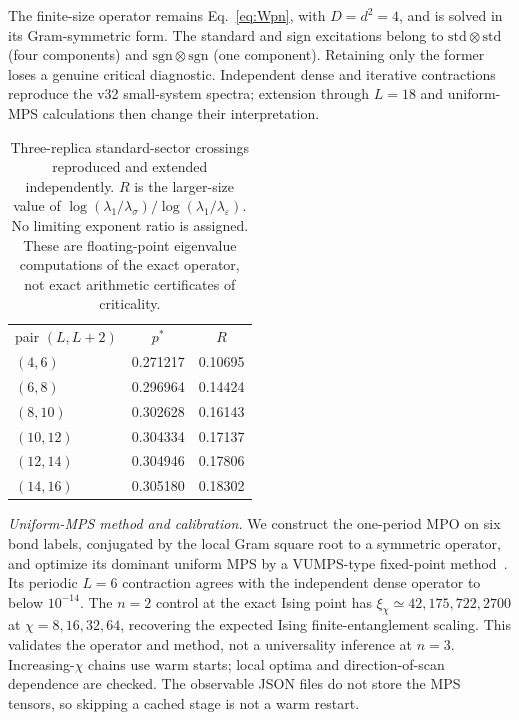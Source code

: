 The finite-size operator remains Eq.~\eqref{eq:Wpn}, with $D=d^2=4$, and is solved in its Gram-symmetric form. The standard and sign excitations belong to $\mathrm{std}\otimes\mathrm{std}$ (four components) and $\mathrm{sgn}\otimes\mathrm{sgn}$ (one component). Retaining only the former loses a genuine critical diagnostic. Independent dense and iterative contractions reproduce the v32 small-system spectra; extension through $L=18$ and uniform-MPS calculations then change their interpretation.

\begin{table}[t]
\caption{Three-replica standard-sector crossings reproduced and extended independently. $R$ is the larger-size value of $\log(\lambda_1/\lambda_\sigma)/\log(\lambda_1/\lambda_\varepsilon)$. No limiting exponent ratio is assigned. These are floating-point eigenvalue computations of the exact operator, not exact arithmetic certificates of criticality.}
\label{tab:n3annealed}
\begin{ruledtabular}
\begin{tabular}{lcc}
pair $(L,L+2)$ & $p^*$ & $R$\\
\colrule
$(4,6)$ & 0.271217 & 0.10695\\
$(6,8)$ & 0.296964 & 0.14424\\
$(8,10)$ & 0.302628 & 0.16143\\
$(10,12)$ & 0.304334 & 0.17137\\
$(12,14)$ & 0.304946 & 0.17806\\
$(14,16)$ & 0.305180 & 0.18302\\
\end{tabular}
\end{ruledtabular}
\end{table}

\emph{Uniform-MPS method and calibration.} We construct the one-period MPO on six bond labels, conjugated by the local Gram square root to a symmetric operator, and optimize its dominant uniform MPS by a VUMPS-type fixed-point method~\cite{ZaunerStauber2018,Fishman2018}. Its periodic $L=6$ contraction agrees with the independent dense operator to below $10^{-14}$. The $n=2$ control at the exact Ising point has $\xi_\chi\simeq42,175,722,2700$ at $\chi=8,16,32,64$, recovering the expected Ising finite-entanglement scaling. This validates the operator and method, not a universality inference at $n=3$. Increasing-$\chi$ chains use warm starts; local optima and direction-of-scan dependence are checked. The observable JSON files do not store the MPS tensors, so skipping a cached stage is not a warm restart.

